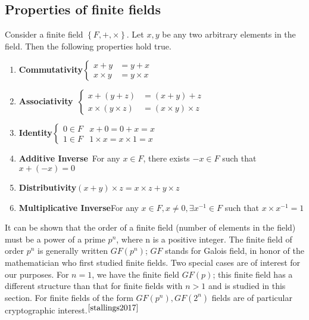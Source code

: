 \documentclass[a4paper,12pt]{article}
\begin{document}
\subsection{Properties of finite fields}
\begin{flushleft}
Consider a finite field $\left\{F,+,\times\right\}$. Let $x,y$ be any two arbitrary elements in the field. Then the following properties hold true.
\begin{enumerate}
	\item \textbf{Commutativity}\qquad\quad $\begin{cases}x+y&=y+x\\x\times y&=y\times x\end{cases}$
	\item \textbf{Associativity}\qquad\qquad\, $\begin{cases}x+(y+z)&=(x+y)+z\\x\times(y\times z)&=(x\times y)\times z\end{cases}$
	\item \textbf{Identity}\qquad\qquad\qquad\quad $\begin{cases}0\in F& x+0=0+x=x\\1\in F&1\times x=x\times 1=x\end{cases}$
	\item \textbf{Additive Inverse}\qquad\quad\, For any $x\in F$, there exists $-x\in F$ such that $x+(-x)=0$
	\item \textbf{Distributivity}\qquad\qquad\quad $(x+y)\times z=x\times z+y\times z$
	\item \textbf{Multiplicative Inverse}\quad For any $x\in F,x\neq 0, \exists x^{-1}\in F$ such that $x\times x^{-1}=1$
\end{enumerate}
\end{flushleft}

\begin{flushleft}
It can be shown that the order of a finite field (number of elements in the field) must be a power of a prime $p^n$, where n is a positive integer. The finite field of order $p^n$ is generally written $GF(p^n)$; $GF$ stands for Galois field, in honor of the mathematician who first studied finite fields. Two special cases are of interest for our purposes. For $n = 1$, we have the finite field $GF(p)$; this finite field has a different structure than that for finite fields with $n>1$ and is studied in this section. For finite fields of the form $GF(p^n), GF(2^n)$ fields are of particular cryptographic interest.${^{\cite{stallings2017}}}$
\end{flushleft}
\end{document}
